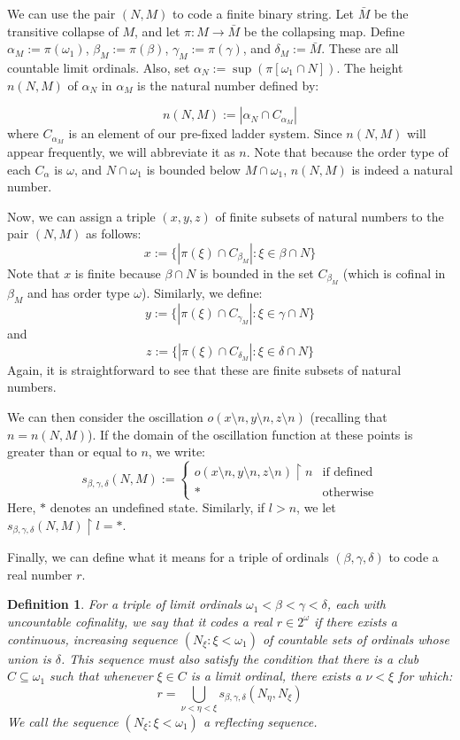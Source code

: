\documentclass[a4paper,11pt]{article}
\newtheorem{definition}[theorem]{Definition}
\begin{document}
We can use the pair $(N,M)$ to code a finite binary string. Let $\bar{M}$ be the transitive collapse of $M$, and let $\pi : M \rightarrow \bar{M}$ be the collapsing map. Define $\alpha_M := \pi(\omega_1)$, $\beta_M := \pi(\beta)$, $\gamma_M := \pi(\gamma)$, and $\delta_M := \bar{M}$. These are all countable limit ordinals. Also, set $\alpha_N := \sup(\pi[\omega_1 \cap N])$. The height $n(N,M)$ of $\alpha_N$ in $\alpha_M$ is the natural number defined by:

$$n(N,M) := |\alpha_N \cap C_{\alpha_M}|$$
where $C_{\alpha_M}$ is an element of our pre-fixed ladder system. Since $n(N,M)$ will appear frequently, we will abbreviate it as $n$. Note that because the order type of each $C_{\alpha}$ is $\omega$, and $N \cap \omega_1$ is bounded below $M \cap \omega_1$, $n(N,M)$ is indeed a natural number.

Now, we can assign a triple $(x,y,z)$ of finite subsets of natural numbers to the pair $(N,M)$ as follows:
$$x := \{ |\pi(\xi) \cap C_{\beta_M}| : \xi \in \beta \cap N \}$$
Note that $x$ is finite because $\beta \cap N$ is bounded in the set $C_{\beta_M}$ (which is cofinal in $\beta_M$ and has order type $\omega$). Similarly, we define:
$$y := \{ |\pi(\xi) \cap C_{\gamma_M}| : \xi \in \gamma \cap N \}$$
and
$$z := \{ |\pi(\xi) \cap C_{\delta_M}| : \xi \in \delta \cap N \}$$
Again, it is straightforward to see that these are finite subsets of natural numbers.

We can then consider the oscillation $o(x \setminus n, y \setminus n, z \setminus n)$ (recalling that $n = n(N,M)$). If the domain of the oscillation function at these points is greater than or equal to $n$, we write:
$$s_{\beta, \gamma, \delta} (N,M) := \begin{cases} o(x \setminus n, y \setminus n, z \setminus n) \restriction n & \text{if defined} \\ \ast & \text{otherwise} \end{cases}$$
Here, $\ast$ denotes an undefined state. Similarly, if $l > n$, we let $s_{\beta, \gamma, \delta} (N,M) \restriction l = \ast$.

Finally, we can define what it means for a triple of ordinals $(\beta, \gamma, \delta)$ to code a real number $r$.

\begin{definition}
For a triple of limit ordinals $\omega_1 < \beta < \gamma < \delta$, each with uncountable cofinality, we say that it codes a real $r \in 2^{\omega}$ if there exists a continuous, increasing sequence $(N_{\xi} : \xi < \omega_1)$ of countable sets of ordinals whose union is $\delta$. This sequence must also satisfy the condition that there is a club $C \subseteq \omega_1$ such that whenever $\xi \in C$ is a limit ordinal, there exists a $\nu < \xi$ for which:
$$r = \bigcup_{\nu < \eta < \xi} s_{\beta, \gamma, \delta} (N_{\eta}, N_{\xi})$$
We call the sequence $(N_{\xi} : \xi < \omega_1)$ a reflecting sequence.
\end{definition}
\end{document}
